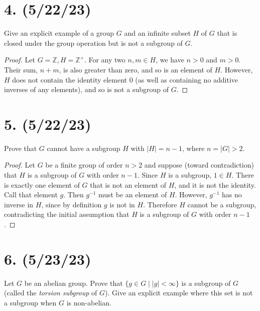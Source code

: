 \documentclass{article}
\begin{document}
\section*{4. (5/22/23)}

Give an explicit example of a group $G$ and an infinite subset $H$ of $G$ that is closed under the group operation but is not a subgroup of $G$.

\begin{proof}
    Let $G = \mathbb{Z}, H = \mathbb{Z}^+$. For any two $n, m \in H$, we have $n > 0$ and $m > 0$. Their sum, $n + m$, is also greater than zero, and so is an element of $H$. However, $H$ does not contain the identity element 0 (as well as containing no additive inverses of any elements), and so is not a subgroup of $G$.
\end{proof}

\section*{5. (5/22/23)}

Prove that $G$ cannot have a subgroup $H$ with $|H| = n - 1$, where $n = |G| > 2$.

\begin{proof}
    Let $G$ be a finite group of order $n > 2$ and suppose (toward contradiction) that $H$ is a subgroup of $G$ with order $n - 1$. Since $H$ is a subgroup, $1 \in H$. There is exactly one element of $G$ that is not an element of $H$, and it is not the identity. Call that element $g$. Then $g^{-1}$ must be an element of $H$. However, $g^{-1}$ has no inverse in $H$, since by definition $g$ is not in $H$. Therefore $H$ cannot be a subgroup, contradicting the initial assumption that $H$ is a subgroup of $G$ with order $n - 1$.
\end{proof}

\section*{6. (5/23/23)}

Let $G$ be an abelian group. Prove that $\{g \in G \mid |g| < \infty \}$ is a subgroup of $G$ (called the \emph{torsion subgroup} of $G$). Give an explicit example where this set is not a subgroup when $G$ is non-abelian.
\end{document}
